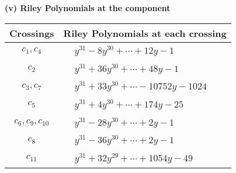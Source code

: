 \documentclass[1p]{elsarticle_modified}
\theoremstyle{definition}
\begin{document}
\newpage\renewcommand{\arraystretch}{1}
\flushleft \textbf{(v) Riley Polynomials at the component}\newline \\
\begin{tabular}{m{50pt}|m{274pt}}
Crossings & \hspace{64pt}Riley Polynomials at each crossing \\
\hline $$\begin{aligned}c_{1},c_{4}\end{aligned}$$&$\begin{aligned}
&y^{31}-8 y^{30}+\cdots+12 y-1
\end{aligned}$\\
\hline $$\begin{aligned}c_{2}\end{aligned}$$&$\begin{aligned}
&y^{31}+36 y^{30}+\cdots+48 y-1
\end{aligned}$\\
\hline $$\begin{aligned}c_{3},c_{7}\end{aligned}$$&$\begin{aligned}
&y^{31}+33 y^{30}+\cdots-10752 y-1024
\end{aligned}$\\
\hline $$\begin{aligned}c_{5}\end{aligned}$$&$\begin{aligned}
&y^{31}+4 y^{30}+\cdots+174 y-25
\end{aligned}$\\
\hline $$\begin{aligned}c_{6},c_{9},c_{10}\end{aligned}$$&$\begin{aligned}
&y^{31}-28 y^{30}+\cdots+2 y-1
\end{aligned}$\\
\hline $$\begin{aligned}c_{8}\end{aligned}$$&$\begin{aligned}
&y^{31}-36 y^{30}+\cdots+2 y-1
\end{aligned}$\\
\hline $$\begin{aligned}c_{11}\end{aligned}$$&$\begin{aligned}
&y^{31}+32 y^{29}+\cdots+1054 y-49
\end{aligned}$\\
\hline
\end{tabular}\\~\\
\end{document}
